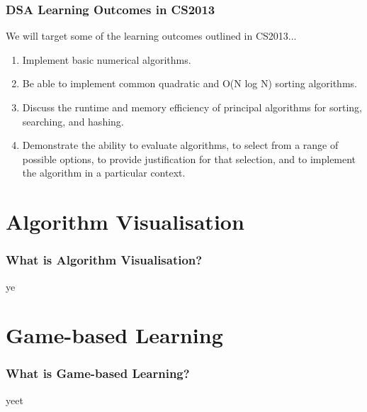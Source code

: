 \documentclass{beamer}
\begin{document}
\begin{frame}
  \frametitle{DSA Learning Outcomes in CS2013}
  We will target some of the learning outcomes outlined in CS2013...
  \begin{enumerate}
    \item Implement basic numerical algorithms.
    \item Be able to implement common quadratic and O(N log N) sorting algorithms.
    \item Discuss the runtime and memory efficiency of principal algorithms for sorting, searching, and hashing.
    \item Demonstrate the ability to evaluate algorithms, to select from a range of possible options, to provide justification for that selection, and to implement the algorithm in a particular context. 
  \end{enumerate}
\end{frame}
\section{Algorithm Visualisation}
\begin{frame}
  \frametitle{What is Algorithm Visualisation?}
  ye
\end{frame}
\section{Game-based Learning}
\begin{frame}
  \frametitle{What is Game-based Learning?}
  yeet
\end{frame}
\end{document}
